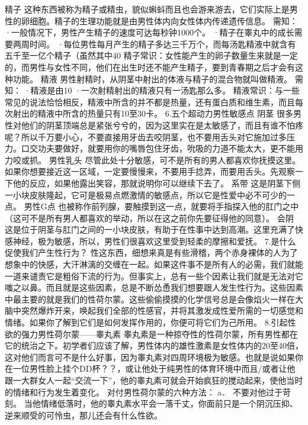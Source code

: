 \documentclass[12pt,UTF8]{ctexbook}
\begin{document}
精子
这种东西被称为精子或精虫，貌似蝌蚪而且也会游来游去，它们实际上是男性的卵细胞。精子的生理功能就是由男性体内向女性体内传递遗传信息。
需知：
·一般情况下，男性产生精子的速度可达每秒钟1000个。
·精子在睾丸中的成长需要两周时间。
·每位男性每月产生的精子多达三千万个，而每汤匙精液中就含有五千至一亿个精子（虽然其中40%
精子常识：女性能产生的卵子数量生来就是一定的，而男性与女性不同，他们在出生时还不能产生精子，要到青春期之后才会有这种功能。
精液
男性射精时，从阴茎中射出的体液与精子的混合物就叫做精液。
需知：
·精液是由10%
·一次射精射出的精液只有一汤匙那么多。
精液常识：与一些常见的说法恰恰相反，精液中所含的并不都是热量，还有蛋白质和维生素，而且每次射出的精液中所含的热量只有10至30卡。
6.五个超动力男性敏感点
阴茎
很多男性对他们的阴茎顶端总是紧张兮兮的，因为这里实在是太敏感了，而且有谁不怕疼呢？所以千万要小心，不要直接用牙齿去咬阴茎，也不要用舌头对它施加过多压力。口交功夫要做好，就要用你的嘴唇包住牙齿，吮吸的力道不能太大，更不能用力咬或抓。
男性乳头
尽管此处十分敏感，可不是所有的男人都喜欢你抚摸这里。如果你想要接近这一区域，一定要慢慢来，不要用手捻弄，而要用舌头。先观察一下他的反应，如果他露出笑容，那就说明你可以继续下去了。
系带
这是阴茎下侧一小块皮肤隆起，它可是极易点燃激情的敏感点，所以它是性爱中必不可少的一点。
男性G点
也被称作前列腺，要触摸到这一点，就要将手指探入他的肛门之中（这可不是所有男人都喜欢的举动，所以在这之前你先要征得他的同意）。
会阴
这是位于阴茎与肛门之间的一小块皮肤，有助于在性事中达到高潮。这里充满了快感神经，极为敏感，所以，男性们很喜欢这里受到轻柔的摩擦和爱抚。
7.是什么促使我们产生性行为？
性这东西，细想来真是有些滑稽，两个赤身裸体的人为了想象中的快感，大汗淋漓的交缠在一起。如果这件事不是所有人的必需，我们就能一道来谴责它是粗俗下流的行为。但事实上，总有一些个因素让我们就是无法对它嗤之以鼻。而且就是这些因素，总是不断怂恿我们想要跟人发生性行为。这些因素中最主要的就是我们的性荷尔蒙。这些偷偷摸摸的化学信号总是会像焰火一样在大脑中突然爆炸开来，唤起我们全部的性感官，并将其激发成性爱所需的一切感觉和情绪。如果你了解到它们是如何发挥作用的，你便可将它们为己所用。
8.引起性欲的强力男性荷尔蒙——睾丸素
睾丸素是一种掠夺性的性荷尔蒙，所有男性都在它的统治之下。初学者们应该了解，男性体内的雄性激素是女性体内的20至40倍，这对他们而言可不是什么好事，因为睾丸素对四周环境极为敏感。也就是说如果你在一位男性脸上挂个DD杯？？，或让他处于纯男性的体育环境中而且/或者让他跟一大群女人一起“交流一下”，他的睾丸素可就会开始疯狂的搅动起来，使他当时的情绪和行为发生着变化。
对付男性荷尔蒙的六种方法：
a． 不要对他过于苛刻。
当他情绪低落时，他的睾丸素水平会一落千丈，你面前只是一个阴沉压抑、逆来顺受的可怜虫，那儿还会有什么性欲。
\end{document}
